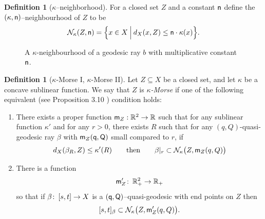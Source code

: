 \documentclass[12 pt]{amsart}
\newcommand{\calN}{\mathcal{N}}
\newcommand{\RR}{\mathbb{R}}
\newcommand{\gothic}{\mathfrak}
\newcommand{\go}{{\gothic o}}
\theoremstyle{definition}
\newtheorem{definition}[theorem]{Definition}
\theoremstyle{remark}
\newcommand{\sQ}{{\sf Q}}
\newcommand{\mm}{{\sf m}}
\newcommand{\nn}{{\sf n}}
\newcommand{\qq}{{\sf q}}
\newcommand{\ST}{\mathbin{\Big|}}
\newcommand{\from}{\colon\thinspace}
\begin{document}
\begin{definition}[$\kappa$--neighborhood]  \label{Def:Neighborhood} 
For a closed set $Z$ and a constant $\nn$ define the $(\kappa, \nn)$--neighbourhood of $Z$ to be 
\[
\calN_\kappa(Z, \nn) = \Big\{ x \in X \ST 
  d_X(x, Z) \leq  \nn \cdot \kappa(x)  \Big\}.
\]


\begin{figure}[h]
\caption{A $\kappa$-neighbourhood of a geodesic ray $b$ with multiplicative constant $\nn$.}
\end{figure}
\end{definition}

\begin{definition} [$\kappa$-Morse I, $\kappa$-Morse II] \label{D:k-morse} \label{Def:Morse} 
Let $Z \subseteq X$ be a closed set, and let $\kappa$ be a concave sublinear function. 
We say that $Z$ is \emph{$\kappa$-Morse} if one of the following equivalent (see Proposition 3.10 \cite{QRT2})  condition holds:
\begin{enumerate}

\item[I.] There exists a proper function 
$\mm_Z : \mathbb{R}^2 \to \mathbb{R}$ such that for any sublinear function $\kappa'$ 
and for any $r > 0$, there exists $R$ such that for any $(q, Q)$-quasi-geodesic ray $\beta$
with $\mm_Z(\qq, \sQ)$ small compared to $r$, if 
$$d_X(\beta_R, Z) \leq \kappa'(R)
\qquad\text{then}\qquad
\beta|_r \subset \calN_\kappa \big(Z, \mm_Z(q, Q)\big)$$


\item[II.] There is a function
\[
\mm'_Z \from \RR_+^2 \to \RR_+
\]
so that if $\beta \from [s,t] \to X$ is a $(\qq, \sQ)$--quasi-geodesic with end points 
on $Z$ then
\[
[s,t]_{\beta}  \subset \calN_{\kappa} \big(Z,  \mm'_Z(q, Q)\big). 
\]
\end{enumerate}
\end{definition} 
\end{document}
